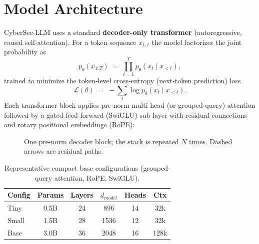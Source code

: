 \documentclass[11pt,a4paper]{article}
\begin{document}
\section{Model Architecture}
CyberSec-LLM uses a standard \textbf{decoder-only transformer} (autoregressive,
causal self-attention). For a token sequence $x_{1:t}$ the model factorizes
the joint probability as
\[
p_\theta(x_{1:T}) \;=\; \prod_{t=1}^{T} p_\theta\!\left(x_t \mid x_{<t}\right),
\]
trained to minimize the token-level cross-entropy (next-token prediction) loss
\[
\mathcal{L}(\theta) \;=\; -\sum_{t} \log p_\theta\!\left(x_t \mid x_{<t}\right).
\]
Each transformer block applies pre-norm multi-head (or grouped-query) attention
followed by a gated feed-forward (SwiGLU) sub-layer with residual connections
and rotary positional embeddings (RoPE):

\begin{figure}[h]
\centering
{}
\caption{One pre-norm decoder block; the stack is repeated $N$ times. Dashed arrows are residual paths.}
\end{figure}

\begin{table}[h]
\centering\small
\begin{tabular}{@{}lccccc@{}}
\toprule
\textbf{Config} & \textbf{Params} & \textbf{Layers} & \textbf{$d_{model}$} & \textbf{Heads} & \textbf{Ctx}\\
\midrule
Tiny  & 0.5B & 24 & 896  & 14 & 32k\\
Small & 1.5B & 28 & 1536 & 12 & 32k\\
Base  & 3.0B & 36 & 2048 & 16 & 128k\\
\bottomrule
\end{tabular}
\caption{Representative compact base configurations (grouped-query attention, RoPE, SwiGLU).}
\end{table}
\end{document}
